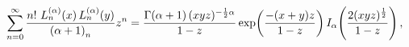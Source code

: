 \[\sum_{n=0}^{\infty}\frac{n!\,\mathop{L^{(\alpha)}_{n}\/}\nolimits\!\left(x%
\right)\mathop{L^{(\alpha)}_{n}\/}\nolimits\!\left(y\right)}{\left(\alpha+1%
\right)_{n}}z^{n}=\frac{\mathop{\Gamma\/}\nolimits\!\left(\alpha+1\right)(xyz)%
^{-\frac{1}{2}\alpha}}{1-z}\*\mathop{\exp\/}\nolimits\!\left(\frac{-(x+y)z}{1-%
z}\right)\mathop{I_{\alpha}\/}\nolimits\!\left(\frac{2(xyz)^{\frac{1}{2}}}{1-z%
}\right),\]